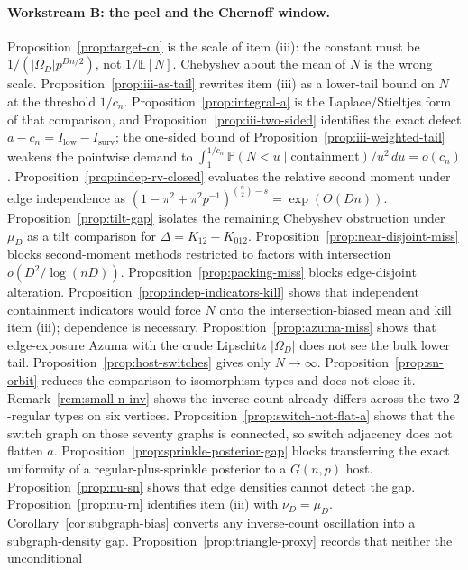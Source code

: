 \documentclass[11pt]{article}
\newcommand{\EE}{\mathbb{E}}
\newcommand{\PP}{\mathbb{P}}
\begin{document}
\paragraph{Workstream B: the peel and the Chernoff window.}
Proposition~\ref{prop:target-cn} is the scale of item (iii): the constant
must be \(1/(\lvert\Omega_D\rvert p^{Dn/2})\), not \(1/\EE[N]\).
Chebyshev about the mean of \(N\) is the wrong scale.
Proposition~\ref{prop:iii-as-tail} rewrites item (iii) as a lower-tail bound
on \(N\) at the threshold \(1/c_n\).
Proposition~\ref{prop:integral-a} is the Laplace/Stieltjes form of that
comparison, and Proposition~\ref{prop:iii-two-sided} identifies the exact
defect \(a-c_n=I_{\mathrm{low}}-I_{\mathrm{surv}}\); the one-sided bound of
Proposition~\ref{prop:iii-weighted-tail} weakens the
pointwise demand to
\(\int_1^{1/c_n}\PP(N<u\mid\text{containment})/u^2\,du=o(c_n)\).
Proposition~\ref{prop:indep-rv-closed} evaluates the relative second moment
under edge independence as
\((1-\pi^2+\pi^2 p^{-1})^{\binom{n}{2}-s}=\exp(\Theta(Dn))\).
Proposition~\ref{prop:tilt-gap} isolates the remaining Chebyshev obstruction
under \(\mu_D\) as a tilt comparison for \(\Delta=K_{12}-K_{012}\).
Proposition~\ref{prop:near-disjoint-miss} blocks second-moment methods
restricted to factors with intersection \(o(D^2/\log(nD))\).
Proposition~\ref{prop:packing-miss} blocks edge-disjoint alteration.
Proposition~\ref{prop:indep-indicators-kill} shows that independent
containment indicators would force \(N\) onto the intersection-biased mean and
kill item (iii); dependence is necessary.
Proposition~\ref{prop:azuma-miss} shows that edge-exposure Azuma with the
crude Lipschitz \(\lvert\Omega_D\rvert\) does not see the bulk lower tail.
Proposition~\ref{prop:host-switches} gives only \(N\to\infty\).
Proposition~\ref{prop:sn-orbit} reduces the comparison to isomorphism types
and does not close it.
Remark~\ref{rem:small-n-inv} shows the inverse count already differs across
the two \(2\)-regular types on six vertices.
Proposition~\ref{prop:switch-not-flat-a} shows that the switch graph on those
seventy graphs is connected, so switch adjacency does not flatten \(a\).
Proposition~\ref{prop:sprinkle-posterior-gap} blocks transferring the exact
uniformity of a regular-plus-sprinkle posterior to a \(G(n,p)\) host.
Proposition~\ref{prop:nu-sn} shows that edge densities cannot detect the gap.
Proposition~\ref{prop:nu-rn} identifies item (iii) with \(\nu_D=\mu_D\).
Corollary~\ref{cor:subgraph-bias} converts any inverse-count oscillation into
a subgraph-density gap.
Proposition~\ref{prop:triangle-proxy} records that neither the unconditional
\end{document}
